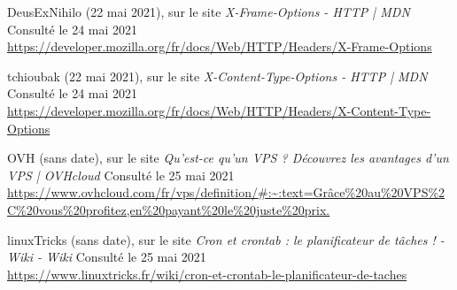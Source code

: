 \begin{thebibliography}{}
DeusExNihilo (22 mai 2021), sur le site \textit{X-Frame-Options - HTTP | MDN} Consulté le 24 mai 2021
\\\url{https://developer.mozilla.org/fr/docs/Web/HTTP/Headers/X-Frame-Options}

tchioubak (22 mai 2021), sur le site \textit{X-Content-Type-Options - HTTP | MDN} Consulté le 24 mai 2021
\\\url{https://developer.mozilla.org/fr/docs/Web/HTTP/Headers/X-Content-Type-Options}

OVH (sans date), sur le site \textit{Qu'est-ce qu'un VPS ? Découvrez les avantages d'un VPS | OVHcloud} Consulté le 25 mai 2021
\\\url{https://www.ovhcloud.com/fr/vps/definition/#:~:text=Grâce%20au%20VPS%2C%20vous%20profitez,en%20payant%20le%20juste%20prix.}

linuxTricks (sans date), sur le site \textit{Cron et crontab : le planificateur de tâches ! - Wiki - Wiki} Consulté le 25 mai 2021
\\\url{https://www.linuxtricks.fr/wiki/cron-et-crontab-le-planificateur-de-taches}

\end{thebibliography}


